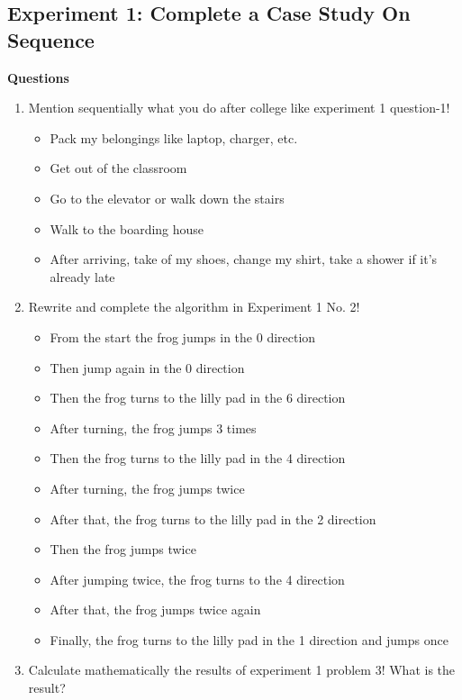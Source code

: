 \documentclass[12pt,titlepage]{article}
\begin{document}
\subsection{Experiment 1: Complete a Case Study On Sequence}
\textbf{Questions}
\begin{enumerate}
    \item {
        Mention sequentially what you do after college like experiment 1 question-1!

        \begin{itemize}
            \item Pack my belongings like laptop, charger, etc.
            \item Get out of the classroom
            \item Go to the elevator or walk down the stairs
            \item Walk to the boarding house
            \item After arriving, take of my shoes, change my shirt, take a shower if it's already late
        \end{itemize}
    }

    \item {
        Rewrite and complete the algorithm in Experiment 1 No. 2!

        \begin{itemize}
            \item From the start the frog jumps in the 0 direction
            \item Then jump again in the 0 direction
            \item Then the frog turns to the lilly pad in the 6 direction
            \item After turning, the frog jumps 3 times
            \item Then the frog turns to the lilly pad in the 4 direction
            \item After turning, the frog jumps twice
            \item After that, the frog turns to the lilly pad in the 2 direction
            \item Then the frog jumps twice
            \item After jumping twice, the frog turns to the 4 direction
            \item After that, the frog jumps twice again
            \item Finally, the frog turns to the lilly pad in the 1 direction and jumps once
        \end{itemize}
    }
    \pagebreak
    \item {
        Calculate mathematically the results of experiment 1 problem 3! What is the result?

}
\end{enumerate}
\end{document}
